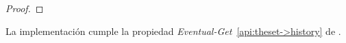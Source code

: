 \begin{proof}

\end{proof}

\begin{lemma}
  La implementación \hashchain cumple la propiedad \textit{Eventual-Get}~\ref{api:theset->history}
  de \setchain.
\end{lemma}

